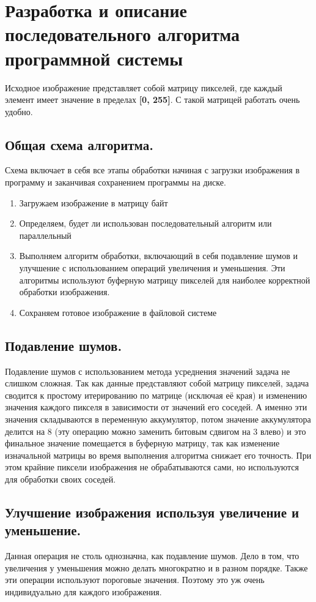\newpage


\section{Разработка и описание последовательного алгоритма программной системы}\label{sec:devalgorythms}
Исходное изображение представляет собой матрицу пикселей, где каждый элемент имеет значение в пределах \textbf{[0, 255]}.
С такой матрицей работать очень удобно.

\subsection{Общая схема алгоритма.}\label{subsec:devalgorythms}
Схема включает в себя все этапы обработки начиная с загрузки изображения в программу и заканчивая сохранением программы на диске.
\begin{enumerate}
    \item Загружаем изображение в матрицу байт
    \item Определяем, будет ли использован последовательный алгоритм или параллельный
    \item Выполняем алгоритм обработки, включающий в себя подавление шумов и улучшение с использованием операций увеличения и уменьшения.
    Эти алгоритмы используют буферную матрицу пикселей для наиболее корректной обработки изображения.
    \item Сохраняем готовое изображение в файловой системе
\end{enumerate}

\subsection{Подавление шумов.}\label{subsec:denoise}
Подавление шумов с использованием метода усреднения значений задача не слишком сложная.
Так как данные представляют собой матрицу пикселей, задача сводится к простому итерированию по матрице (исключая её края) и изменению значения каждого пикселя в зависимости от значений его соседей.
А именно эти значения складываются в переменную аккумулятор, потом значение аккумулятора делится на 8 (эту операцию можно заменить битовым сдвигом на 3 влево) и это финальное значение помещается в буферную матрицу, так как изменение изначальной матрицы во время выполнения алгоритма снижает его точность.
При этом крайние пиксели изображения не обрабатываются сами, но используются для обработки своих соседей.

\subsection{Улучшение изображения используя увеличение и уменьшение.}\label{subsec:upgrade}
Данная операция не столь однозначна, как подавление шумов.
Дело в том, что увеличения у уменьшения можно делать многократно и в разном порядке.
Также эти операции используют пороговые значения.
Поэтому это уж очень индивидуально для каждого изображения.

